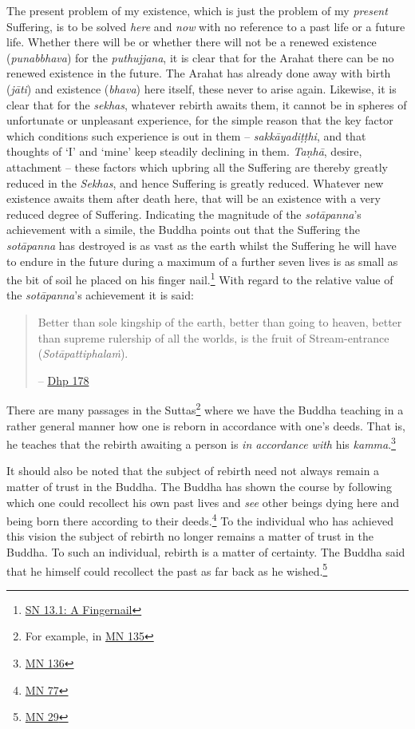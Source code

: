 The present problem of my existence, which is just the problem of my \emph{present} Suffering, is to be solved \emph{here} and \emph{now} with no reference to a past life or a future life. Whether there will be or whether there will not be a renewed existence (\textit{punabbhava}) for the \textit{puthujjana}, it is clear that for the Arahat there can be no renewed existence in the future. The Arahat has already done away with birth (\textit{jāti}) and existence (\textit{bhava}) here itself, these never to arise again. Likewise, it is clear that for the \textit{sekhas}, whatever rebirth awaits them, it cannot be in spheres of unfortunate or unpleasant experience, for the simple reason that the key factor which conditions such experience is out in them -- \textit{sakkāyadiṭṭhi}, and that thoughts of `I' and `mine' keep steadily declining in them. \textit{Taṇhā}, desire, attachment -- these factors which upbring all the Suffering are thereby greatly reduced in the \textit{Sekhas}, and hence Suffering is greatly reduced. Whatever new existence awaits them after death here, that will be an existence with a very reduced degree of Suffering. Indicating the magnitude of the \textit{sotāpanna}'s achievement with a simile, the Buddha points out that the Suffering the \textit{sotāpanna} has destroyed is as vast as the earth whilst the Suffering he will have to endure in the future during a maximum of a further seven lives is as small as the bit of soil he placed on his finger nail.\footnote{\href{https://suttacentral.net/sn13.1/en/sujato}{SN 13.1: A Fingernail}} With regard to the relative value of the \textit{sotāpanna}'s achievement it is said:

\begin{quote}
Better than sole kingship of the earth, better than going to heaven, better than supreme rulership of all the worlds, is the fruit of Stream-entrance (\textit{Sotāpattiphalaṁ}).

 -- \href{https://suttacentral.net/dhp167-178/en/sujato}{Dhp 178}
\end{quote}

There are many passages in the Suttas\footnote{For example, in \href{https://suttacentral.net/mn135/en/bodhi}{MN 135}} where we have the Buddha teaching in a rather general manner how one is reborn in accordance with one's deeds. That is, he teaches that the rebirth awaiting a person is \emph{in accordance with} his \textit{kamma}.\footnote{\href{https://suttacentral.net/mn136/en/thanissaro}{MN 136}}

It should also be noted that the subject of rebirth need not always remain a matter of trust in the Buddha. The Buddha has shown the course by following which one could recollect his own past lives and \emph{see} other beings dying here and being born there according to their deeds.\footnote{\href{https://suttacentral.net/mn77/en/bodhi}{MN 77}} To the individual who has achieved this vision the subject of rebirth no longer remains a matter of trust in the Buddha. To such an individual, rebirth is a matter of certainty. The Buddha said that he himself could recollect the past as far back as he wished.\footnote{\href{https://suttacentral.net/mn29/en/bodhi}{MN 29}}

